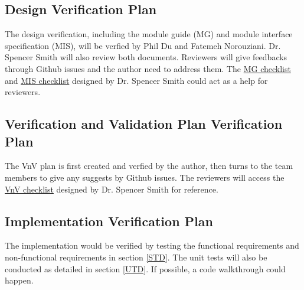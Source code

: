 \documentclass[12pt, titlepage]{article}
\begin{document}

\subsection{Design Verification Plan}\label{DVP}
The design verification, including the module guide (MG) and module interface specification (MIS), will be verfied by Phil Du and Fatemeh Norouziani. Dr. Spencer Smith will also review both documents. Reviewers will give feedbacks through Github issues and the author need to address them. The \href{https://github.com/CynthiaLiu0805/BridgeCorrosion/blob/main/docs/Checklists/MG-Checklist.pdf}{MG checklist} and \href{https://github.com/CynthiaLiu0805/BridgeCorrosion/blob/main/docs/Checklists/MIS-Checklist.pdf}{MIS checklist} designed by Dr. Spencer Smith could act as a help for reviewers.



\subsection{Verification and Validation Plan Verification Plan}\label{VnVP}
The VnV plan is first created and verfied by the author, then turns to the team members to give any suggests by Github issues. The reviewers will access the \href{https://github.com/CynthiaLiu0805/BridgeCorrosion/blob/main/docs/Checklists/VnV-Checklist.pdf}{VnV checklist} designed by Dr. Spencer Smith for reference.



\subsection{Implementation Verification Plan}\label{IVP}
The implementation would be verified by testing the functional requirements and non-functional requirements in section \ref{STD}. The unit tests will also be conducted as detailed in section \ref{UTD}. If possible, a code walkthrough could happen.
\end{document}
